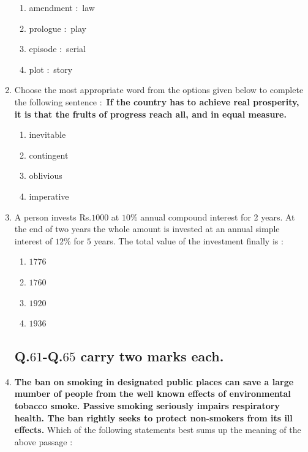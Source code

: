 \documentclass[journal,12pt,onecolumn]{IEEEtran}
\theoremstyle{remark}
\begin{document}
\begin{enumerate}
\hfill{}

\begin{enumerate}
\item amendment $\colon$ law
\item prologue $\colon$ play
\item episode $\colon$ serial
\item plot $\colon$ story
\end{enumerate}

\item Choose the most appropriate word from the options given below to complete the following
sentence $\colon$
\textbf{If the country has to achieve real prosperity, it is \underline{\hspace{1.5cm}} that the frults of progress reach all, and in equal measure.}


\hfill{}

\begin{enumerate}
\item inevitable
\item contingent
\item oblivious
\item imperative
\end{enumerate}

\item A person invests Rs.$1000$ at $10$\% annual compound interest for 2 years. At the end of two years the
whole amount is invested at an annual simple interest of $12$\% for $5$ years. The total value of the
investment finally is $\colon$


\hfill{}

\begin{multicols}{4}
\begin{enumerate}
\item $1776$
\item $1760$
\item $1920$
\item $1936$
\end{enumerate}
\end{multicols}


\subsection*{Q.$61$-Q.$65$ carry two marks each.}
\item \textbf{The ban on smoking in designated public places can save a large mumber of people from the
well known effects of environmental tobacco smoke. Passive smoking seriously impairs respiratory health. The ban rightly seeks to protect non-smokers from its ill effects.}
Which of the following statements best sums up the meaning of the above passage $\colon$



\end{enumerate}
\end{document}

